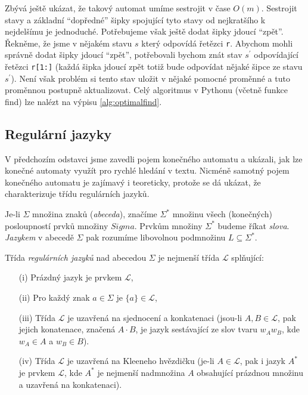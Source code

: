 Zbývá ještě ukázat, že takový automat umíme sestrojit v čase \(O(m)\).  Sestrojit stavy
a základní ``dopředné'' šipky spojující tyto stavy od nejkratšího k nejdelšímu je jednoduché.
Potřebujeme však ještě dodat šipky jdoucí ``zpět''.  Řekněme, že jsme  v nějakém stavu \(s\) 
který odpovídá řetězci {\tt r}. Abychom mohli správně dodat šipky jdoucí ``zpět'', potřebovali
bychom znát stav \(s^\prime\) odpovídající řetězci {\tt r[1:]} (každá šipka jdoucí zpět totiž bude 
odpovídat nějaké šipce ze stavu \(s^\prime\)). Není však problém si tento stav uložit v nějaké
pomocné proměnné a tuto proměnnou postupně aktualizovat.  Celý algoritmus v Pythonu
(včetně funkce find) lze nalézt na výpisu \ref{alg:optimalfind}.


\subsection{Regulární jazyky}

V předchozím odstavci jsme zavedli pojem konečného automatu a ukázali, jak lze konečné
automaty využít pro rychlé hledání v textu. Nicméně samotný pojem konečného automatu 
je zajímavý i teoreticky, protože se dá ukázat, že charakterizuje třídu regulárních jazyků. 

\begin{definition} Je-li \(\Sigma\) množina znaků (\emph{abeceda}), značíme \(\Sigma^*\) množinu všech
(konečných) posloupností prvků množiny \(Sigma\). Prvkům množiny \(\Sigma^*\) budeme říkat
\emph{slova}.  \emph{Jazykem} v abecedě \(\Sigma\) pak rozumíme libovolnou podmnožinu \(L\subseteq\Sigma^*\).
\end{definition}

\begin{definition}  Třída \emph{regulárních jazyků} nad abecedou \(\Sigma\) je nejmenší třída \(\mathcal L\) splňující:
\begin{itemize}
  \item[(i)] Prázdný jazyk je prvkem \(\mathcal L\),
 \item[(ii)] Pro každý znak \(a\in\Sigma\) je \(\{a\}\in\mathcal L\),
 \item[(iii)] Třída \(\mathcal L\) je uzavřená na sjednocení a konkatenaci (jsou-li \(A,B\in\mathcal L\), pak jejich konatenace,
                     značená \(A\cdot B\), je jazyk sestávající ze slov tvaru \(w_Aw_B\), kde \(w_A\in A\) a \(w_B\in B\)).
 \item[(iv)] Třída \(\mathcal L\) je uzavřená na Kleeneho hvězdičku (je-li \(A\in\mathcal L\), pak i jazyk \(A^*\) je prvkem
                     \(\mathcal L\), kde \(A^*\) je nejmenší nadmnožina \(A\) obsahující prázdnou množinu a uzavřená na konkatenaci).
\end{itemize}
\end{definition}

